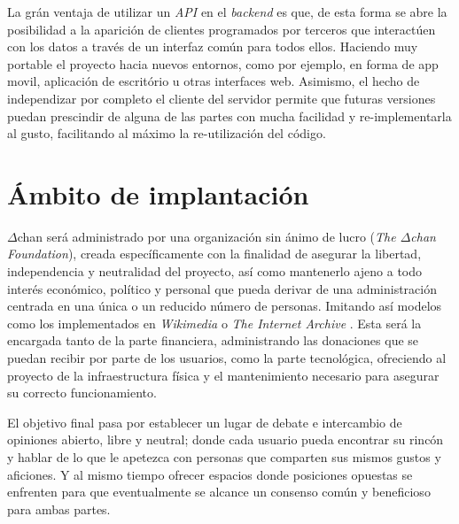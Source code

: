 \documentclass[12pt,a4paper,titlepage]{article}
\newcommand\projectname{$\Delta$chan}
\begin{document}
    La grán ventaja de utilizar un \emph{API} en el \textit{backend} es que, de esta forma se abre la posibilidad a la aparición de clientes programados por terceros que interactúen con los datos a través de un interfaz común para todos ellos. Haciendo muy portable el proyecto hacia nuevos entornos, como por ejemplo, en forma de app movil, aplicación de escritório u otras interfaces web. Asimismo, el hecho de independizar por completo el cliente del servidor permite que futuras versiones puedan prescindir de alguna de las partes con mucha facilidad y re-implementarla al gusto, facilitando al máximo la re-utilización del código.

    \section{Ámbito de implantación}



    {\projectname} será administrado por una organización sin ánimo de lucro (\textit{The {\projectname} Foundation}), creada específicamente con la finalidad de asegurar la libertad, independencia y neutralidad del proyecto, así como mantenerlo ajeno a todo interés económico, político y personal que pueda derivar de una administración centrada en una única o un reducido número de personas. Imitando así modelos como los implementados en \emph{Wikimedia} \cite{wikimedia:about} o \emph{The Internet Archive} \cite{internetarchive:about}. Esta será la encargada tanto de la parte financiera, administrando las donaciones que se puedan recibir por parte de los usuarios, como la parte tecnológica, ofreciendo al proyecto de la infraestructura física y el mantenimiento necesario para asegurar su correcto funcionamiento.
    
    El objetivo final pasa por establecer un lugar de debate e intercambio de opiniones abierto, libre y neutral; donde cada usuario pueda encontrar su rincón y hablar de lo que le apetezca con personas que comparten sus mismos gustos y aficiones. Y al mismo tiempo ofrecer espacios donde posiciones opuestas se enfrenten para que eventualmente se alcance un consenso común y beneficioso para ambas partes.
    
\end{document}
